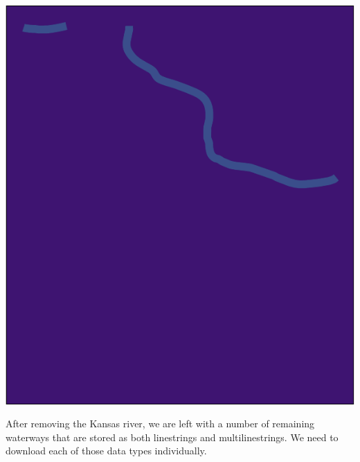 \documentclass[
  paper=a4,
  ,captions=tableheading
]{scrartcl}
\begin{document}
\includegraphics{Haskell_files/figure-latex/unnamed-chunk-20-1.pdf}

After removing the Kansas river, we are left with a number of remaining
waterways that are stored as both linestrings and multilinestrings. We
need to download each of those data types individually.
\end{document}
